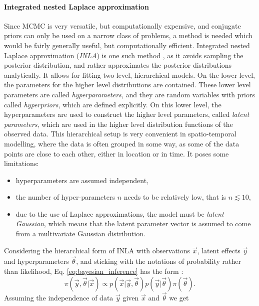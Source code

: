 \paragraph{Integrated nested Laplace approximation}
Since MCMC is very versatile, but computationally expensive, and conjugate priors can only be used on a narrow class of problems, a method is needed which would be fairly generally useful, but computationally efficient. Integrated nested Laplace approximation (\textit{INLA}) is one such method \citep{rue2009approximate,martins2013bayesian}, as it avoids sampling the posterior distribution, and rather approximates the posterior distributions analytically. It allows for fitting two-level, hierarchical models. On the lower level, the parameters for the higher level distributions are contained. These lower level parameters are called \textit{hyperparameters}, and they are random variables with priors called \textit{hyperpriors}, which are defined explicitly. On this lower level, the hyperparameters are used to construct the higher level parameters, called \textit{latent parameters}, which are used in the higher level distribution functions of the observed data. This hierarchical setup is very convenient in spatio-temporal modelling, where the data is often grouped in some way, as some of the data points are close to each other, either in location or in time. It poses some limitations:
\begin{itemize}
    \item hyperparameters are assumed independent,
    \item the number of hyper-parameters $n$ needs to be relatively low, that is $n \lesssim 10$,
    \item due to the use of Laplace approximations, the model must be \textit{latent Gaussian}, which means that the latent parameter vector is assumed to come from a multivariate Gaussian distribution.
\end{itemize}
Considering the hierarchical form of INLA with observations $\vec{x}$, latent effects $\vec{y}$ and hyperparameters $\vec{\theta}$, and sticking with the notations of probability rather than likelihood, Eq. \ref{eq:bayesian_inference} has the form \citep{gomez2020bayesian}:
\begin{equation}
    \pi(\vec{y}, \vec{\theta}|\vec{x}) \propto p(\vec{x}|\vec{y}, \vec{\theta}) p(\vec{y}|\vec{\theta}) \pi(\vec{\theta}).
    \label{eq:bayesian_hierarchical}
\end{equation}
Assuming the independence of data $\vec{y}$ given $\vec{x}$ and $\vec{\theta}$ we get
